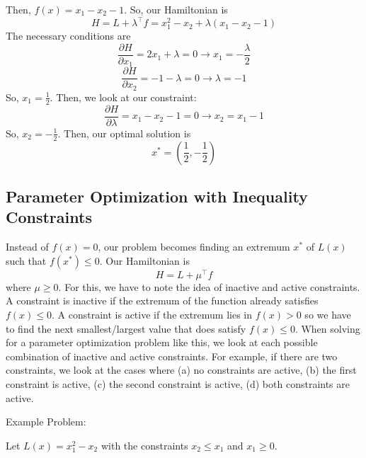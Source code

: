 \documentclass{article}
\begin{document}
\noindent
Then, $f(x) = x_1 - x_2 - 1$. So, our Hamiltonian is
\[H = L + \lambda^\top f = x_1^2 - x_2 + \lambda(x_1-x_2-1)\]
The necessary conditions are
\[\frac{\partial H}{\partial x_1} = 2x_1 + \lambda = 0 \rightarrow x_1 = -\frac{\lambda}{2}\]
\[\frac{\partial H}{\partial x_2} = -1 - \lambda = 0 \rightarrow \lambda = -1\]
So, $x_1 = \frac{1}{2}$. Then, we look at our constraint:
\[\frac{\partial H}{\partial \lambda} = x_1 - x_2 - 1 = 0 \rightarrow x_2 = x_1 - 1\]
So, $x_2 = -\frac{1}{2}$. Then, our optimal solution is
\[x^* = \left(\frac{1}{2},-\frac{1}{2}\right)\]

\subsection{Parameter Optimization with Inequality Constraints}

Instead of $f(x) = 0$, our problem becomes finding an extremum $x^*$ of $L(x)$
such that $f(x^*) \le 0$. Our Hamiltonian is
\[H = L + \mu^\top f\]
where $\mu \ge 0$. For this, we have to note the idea of inactive and active
constraints. A constraint is inactive if the extremum of the function already
satisfies $f(x) \le 0$. A constraint is active if the extremum lies in $f(x) > 0$
so we have to find the next smallest/largest value that does satisfy $f(x) \le 0$.
When solving for a parameter optimization problem like this, we look at each possible combination
of inactive and active constraints. For example, if there are two constraints,
we look at the cases where (a) no constraints are active, (b) the first constraint is active,
(c) the second constraint is active, (d) both constraints are active.

\noindent
Example Problem:

\noindent
Let $L(x) = x_1^2 - x_2$ with the constraints $x_2 \le x_1$ and $x_1 \ge 0$.
\end{document}
